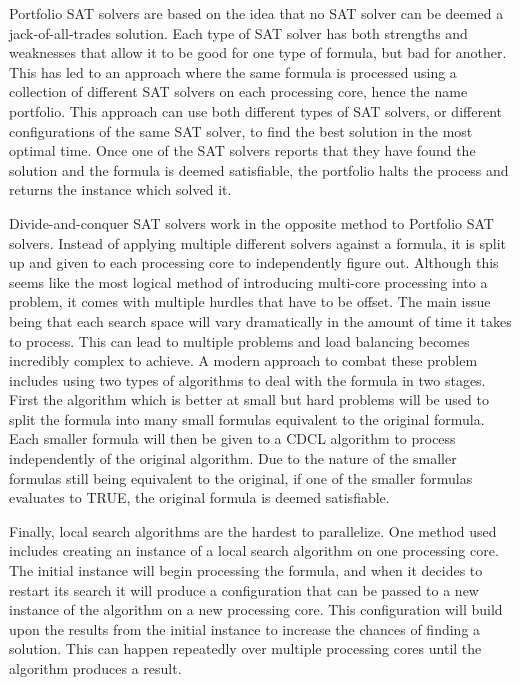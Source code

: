 \documentclass{article}
\begin{document}
    Portfolio SAT solvers are based on the idea that no SAT solver can be deemed a jack-of-all-trades solution. Each type of SAT solver has
    both strengths and weaknesses that allow it to be good for one type of formula, but bad for another. This has led to an approach where
    the same formula is processed using a collection of different SAT solvers on each processing core, hence the name portfolio. This
    approach can use both different types of SAT solvers, or different configurations of the same SAT solver, to find the best solution in
    the most optimal time. Once one of the SAT solvers reports that they have found the solution and the formula is deemed satisfiable, the
    portfolio halts the process and returns the instance which solved it\cite{parallel}.

    Divide-and-conquer SAT solvers work in the opposite method to Portfolio SAT solvers. Instead of applying multiple different solvers
    against a formula, it is split up and given to each processing core to independently figure out. Although this seems like the most
    logical method of introducing multi-core processing into a problem, it comes with multiple hurdles that have to be offset. The main issue
    being that each search space will vary dramatically in the amount of time it takes to process. This can lead to multiple
    problems and load balancing becomes incredibly complex to achieve\cite{parallel}. A modern approach to combat these problem includes using two types of
    algorithms to deal with the formula in two stages. First the algorithm which is better at small but hard problems will be used to split
    the formula into many small formulas equivalent to the original formula. Each smaller formula will then be given to a CDCL
    algorithm to process independently of the original algorithm. Due to the nature of the smaller formulas still being equivalent to the
    original, if one of the smaller formulas evaluates to TRUE, the original formula is deemed satisfiable\cite{div}.

    Finally, local search algorithms are the hardest to parallelize. One method used includes creating an instance of a local search
    algorithm on one processing core. The initial instance will begin processing the formula, and when it decides to restart its search it
    will produce a configuration that can be passed to a new instance of the algorithm on a new processing core. This configuration will
    build upon the results from the initial instance to increase the chances of finding a solution. This can happen repeatedly over multiple
    processing cores until the algorithm produces a result\cite{local}.
\end{document}
